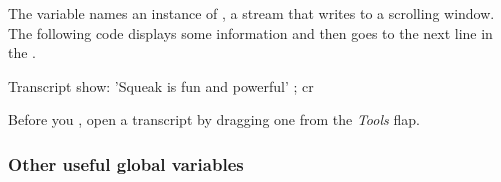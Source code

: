 \documentclass[a4paper,10pt,twoside]{book}
\begin{document}
The variable  names an instance of , a stream that writes to a scrolling window.
The following code displays some information and then goes to the next line in the .

\begin{code}{}
Transcript show: 'Squeak is fun and powerful' ; cr
\end{code}

\noindent
Before you , open a transcript by dragging one from the \emph{Tools} flap.


\subsubsection{Other useful global variables}
\end{document}

